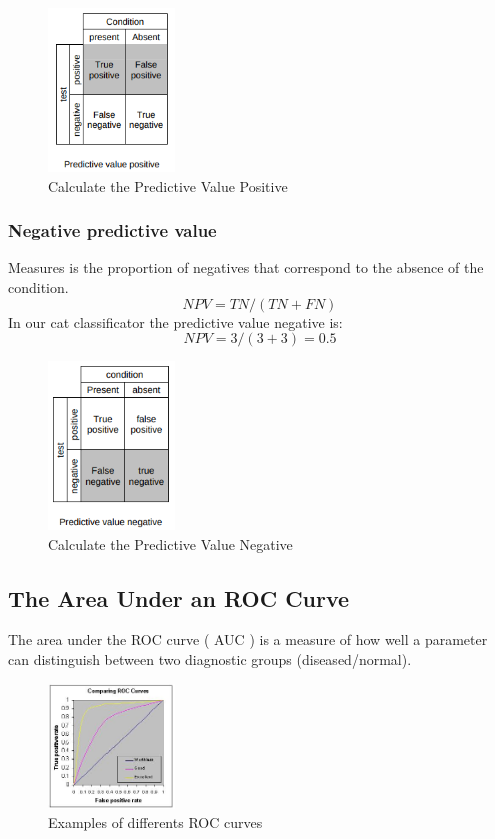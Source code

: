 \begin{figure}[H]
\centering
\includegraphics[width=0.3\textwidth]{./figures/PredictiveValuePositive}
\caption{Calculate the Predictive Value Positive}
\end{figure}


\subsubsection[Negative predictive value]{Negative predictive value}
Measures is the proportion of negatives that correspond to the absence of the condition. 
\[ NPV =  TN/(TN+FN) \]
In our cat classificator the predictive value negative is:
\[ NPV = 3/(3+3) = 0.5 \]

\begin{figure}[H]
\centering
\includegraphics[width=0.3\textwidth]{./figures/PredictiveValueNegative}
\caption{Calculate the Predictive Value Negative}
\end{figure}

\subsection[The Area Under an ROC Curve]{The Area Under an ROC Curve}

The area under the ROC curve ( AUC ) is a measure of how well a parameter can distinguish between two diagnostic groups (diseased/normal). 

\begin{figure}[H]
\centering
\includegraphics[width=0.3\textwidth]{./figures/ROC}
\caption{Examples of differents ROC curves \cite{area-roc-curve}}
\end{figure}

